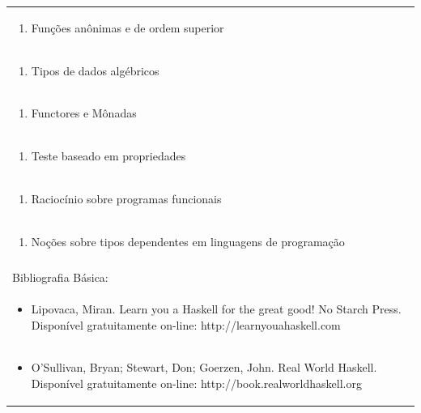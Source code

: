 \documentclass[11pt]{article}
\begin{document}
\begin{center}
\begin{longtable}{|p{4cm}|p{4cm}|p{4cm}|p{4cm}|}
\multicolumn{4}{|p{\dimexpr 16cm + 6\tabcolsep\relax}|}{\begin{enumerate}[start=8]\item Funções anônimas e de ordem superior\end{enumerate}}\\
\multicolumn{4}{|p{\dimexpr 16cm + 6\tabcolsep\relax}|}{\begin{enumerate}[start=9]\item Tipos de dados algébricos\end{enumerate}}\\
\multicolumn{4}{|p{\dimexpr 16cm + 6\tabcolsep\relax}|}{\begin{enumerate}[start=10]\item Functores e Mônadas\end{enumerate}}\\
\multicolumn{4}{|p{\dimexpr 16cm + 6\tabcolsep\relax}|}{\begin{enumerate}[start=11]\item Teste baseado em propriedades\end{enumerate}}\\
\multicolumn{4}{|p{\dimexpr 16cm + 6\tabcolsep\relax}|}{\begin{enumerate}[start=12]\item Raciocínio sobre programas funcionais\end{enumerate}}\\
\multicolumn{4}{|p{\dimexpr 16cm + 6\tabcolsep\relax}|}{\begin{enumerate}[start=13]\item Noções sobre tipos dependentes em linguagens de programação\end{enumerate}}\\
\multicolumn{4}{|p{\dimexpr 16cm + 6\tabcolsep\relax}|}{}\\
\hline
\multicolumn{4}{|p{16cm}|}{Bibliografia Básica:}\\*
\multicolumn{4}{|p{\dimexpr 16cm + 6\tabcolsep\relax}|}{\begin{itemize}\item Lipovaca, Miran. Learn you a Haskell for the great good! No Starch Press. Disponível gratuitamente on-line: http://learnyouahaskell.com\end{itemize}}\\
\multicolumn{4}{|p{\dimexpr 16cm + 6\tabcolsep\relax}|}{\begin{itemize}\item O'Sullivan, Bryan; Stewart, Don; Goerzen, John. Real World Haskell. Disponível gratuitamente on-line: http://book.realworldhaskell.org\end{itemize}}\\

\end{longtable}
\end{center}
\end{document}
